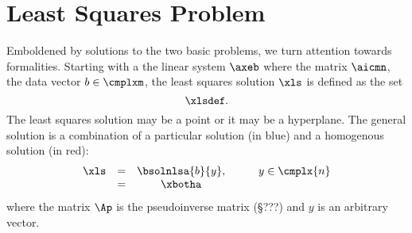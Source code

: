 \section{\label{sec:lsp}Least Squares Problem}  %
Emboldened by solutions to the two basic problems, we turn attention towards formalities. Starting with a the linear system $\axeb$ where the matrix $\aicmn$, the data vector $b\in\cmplxm$, the least squares solution $\xls$ is defined as the set
  \begin{equation}   %
    \xlsdef .
    \label{eq:xlsdef}
  \end{equation}
The least squares solution may be a point or it may be a hyperplane. The general solution is a combination of a particular solution (in blue) and a homogenous solution (in red):
  \begin{equation}   %
   \begin{array}{cccccl}
     \xls 
       & = & \bsolnlsa{b}{y}, & \qquad y \in \cmplx{n} \\
       & = & \xbotha
    \label{eq:general soln}
   \end{array}
  \end{equation}
where the matrix $\Ap$ is the pseudoinverse matrix (\S ???) and $y$ is an arbitrary vector.


\endinput